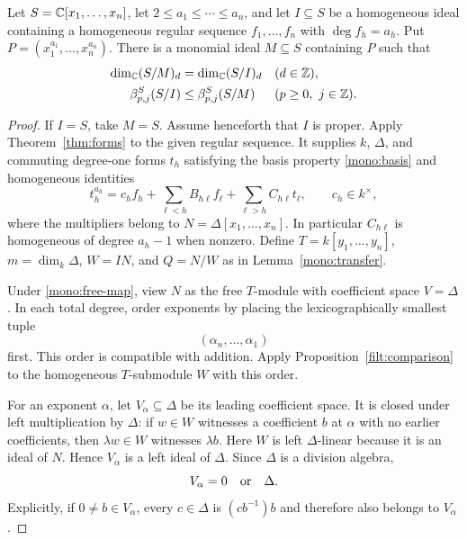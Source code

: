 \begin{proposition}
\label{mono:bound}
Let $S=\mathbb C[x_1,\ldots,x_n]$, let
$2\leq a_1\leq\cdots\leq a_n$, and let $I\subseteq S$ be a
homogeneous ideal containing a homogeneous regular sequence
$f_1,\ldots,f_n$ with $\deg f_h=a_h$.  Put
$P=(x_1^{a_1},\ldots,x_n^{a_n})$.
There is a monomial ideal $M\subseteq S$ containing $P$ such that
\begin{align}
 \dim_\mathbb C(S/M)_d&=\dim_\mathbb C(S/I)_d
                   &&(d\in\mathbb Z),\label{mono:hilbert-bound}\\
 \beta^S_{p,j}(S/I)&\leq\beta^S_{p,j}(S/M)
                   &&(p\geq0,\ j\in\mathbb Z).
                   \label{mono:betti-bound}
\end{align}
\end{proposition}

\begin{proof}
If $I=S$, take $M=S$.  Assume henceforth that $I$ is proper.
Apply Theorem~\ref{thm:forms} to the given regular sequence.  It
supplies $k$, $\Delta$, and commuting degree-one forms $t_h$ satisfying
the basis property \eqref{mono:basis} and homogeneous identities
\begin{equation}
 t_h^{a_h}=c_hf_h+\sum_{\ell<h}B_{h\ell}f_\ell
                       +\sum_{\ell>h}C_{h\ell}t_\ell,
 \qquad c_h\in k^\times,
 \label{mono:triangular}
\end{equation}
where the multipliers belong to $N=\Delta[x_1,\ldots,x_n]$.
In particular $C_{h\ell}$ is homogeneous of degree $a_h-1$ when
nonzero.  Define $T=k[y_1,\ldots,y_n]$, $m=\dim_k\Delta$,
$W=IN$, and $Q=N/W$ as in Lemma~\ref{mono:transfer}.

Under \eqref{mono:free-map}, view $N$ as the free $T$-module with
coefficient space $V=\Delta$.  In each total degree, order exponents
by placing the lexicographically smallest tuple
\[
                         (\alpha_n,\ldots,\alpha_1)
\]
first.  This order is compatible with addition.  Apply
Proposition~\ref{filt:comparison} to the homogeneous $T$-submodule
$W$ with this order.

For an exponent $\alpha$, let $V_\alpha\subseteq\Delta$ be its
leading coefficient space.  It is closed under left multiplication
by $\Delta$: if $w\in W$ witnesses a coefficient $b$ at $\alpha$
with no earlier coefficients, then $\lambda w\in W$ witnesses
$\lambda b$.  Here $W$ is left $\Delta$-linear because it is an ideal
of $N$.  Hence $V_\alpha$ is a left ideal of $\Delta$.  Since
$\Delta$ is a division algebra,
\[
                         V_\alpha=0\quad\hbox{or}\quad\Delta.
\]
Explicitly, if $0\ne b\in V_\alpha$, every $c\in\Delta$ is
$(cb^{-1})b$ and therefore also belongs to $V_\alpha$.


\end{proof}
